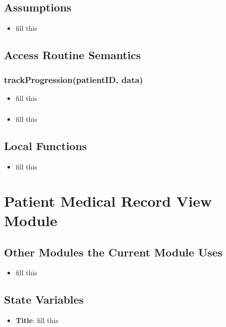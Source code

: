 \documentclass[12pt, titlepage]{article}
\begin{document}
\subsection{Assumptions}
\begin{itemize}
    \item fill this
\end{itemize}

\subsection{Access Routine Semantics}
\subsubsection{trackProgression(patientID, data)}

\begin{itemize}
    \item fill this
\end{itemize}

\subsubsection{}

\begin{itemize}
    \item fill this
\end{itemize}


\subsection{Local Functions}
\begin{itemize}
    \item fill this
\end{itemize}
\section{Patient Medical Record View Module}

\subsection{Other Modules the Current Module Uses}
\begin{itemize}
    \item fill this 
\end{itemize}

\subsection{State Variables}
\begin{itemize}
    \item \textbf{Title}: fill this 
\end{itemize}
\end{document}
